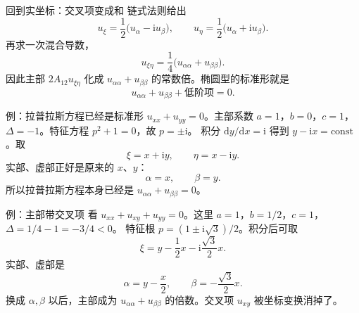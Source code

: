 \documentclass[fontset=windows, chinese, 10pt, xcolor=dvipsnames]{beamer}
\begin{document}
\begin{frame}{回到实坐标：交叉项变成和}
  链式法则给出
  \begin{equation*}
    u_\xi=\frac12\bigl(u_\alpha-\mathrm{i}u_\beta\bigr),
    \qquad
    u_\eta=\frac12\bigl(u_\alpha+\mathrm{i}u_\beta\bigr).
  \end{equation*}
  再求一次混合导数，
  \begin{equation*}
    u_{\xi\eta}
    =\frac14\bigl(u_{\alpha\alpha}+u_{\beta\beta}\bigr).
  \end{equation*}
  因此主部 $2A_{12}u_{\xi\eta}$ 化成 $u_{\alpha\alpha}+u_{\beta\beta}$ 的常数倍。椭圆型的标准形就是
  \begin{equation*}
    \boxed{u_{\alpha\alpha}+u_{\beta\beta}+\text{低阶项}=0.}
  \end{equation*}
\end{frame}

\begin{frame}{例：拉普拉斯方程已经是标准形}
  $u_{xx}+u_{yy}=0$。主部系数 $a=1$，$b=0$，$c=1$，$\Delta=-1$。特征方程 $p^2+1=0$，故 $p=\pm\mathrm{i}$。
  \vspace{0.3em}
  积分 $\mathrm{d}y/\mathrm{d}x=\mathrm{i}$ 得到 $y-\mathrm{i}x=\mathrm{const}$。取
  \begin{equation*}
    \xi=x+\mathrm{i}y,
    \qquad
    \eta=x-\mathrm{i}y.
  \end{equation*}
  实部、虚部正好是原来的 $x$、$y$：
  \begin{equation*}
    \alpha=x,\qquad \beta=y.
  \end{equation*}
  所以拉普拉斯方程本身已经是 $u_{\alpha\alpha}+u_{\beta\beta}=0$。
\end{frame}

\begin{frame}{例：主部带交叉项}
  看 $u_{xx}+u_{xy}+u_{yy}=0$。这里 $a=1$，$b=1/2$，$c=1$，$\Delta=1/4-1=-3/4<0$。
  特征根 $p=(1\pm\mathrm{i}\sqrt{3})/2$。积分后可取
  \begin{equation*}
    \xi=y-\frac12 x-\mathrm{i}\frac{\sqrt{3}}{2}x.
  \end{equation*}
  实部、虚部是
  \begin{equation*}
    \alpha=y-\frac{x}{2},
    \qquad
    \beta=-\frac{\sqrt{3}}{2}x.
  \end{equation*}
  换成 $\alpha,\beta$ 以后，主部成为 $u_{\alpha\alpha}+u_{\beta\beta}$ 的倍数。交叉项 $u_{xy}$ 被坐标变换消掉了。
\end{frame}

\end{document}
